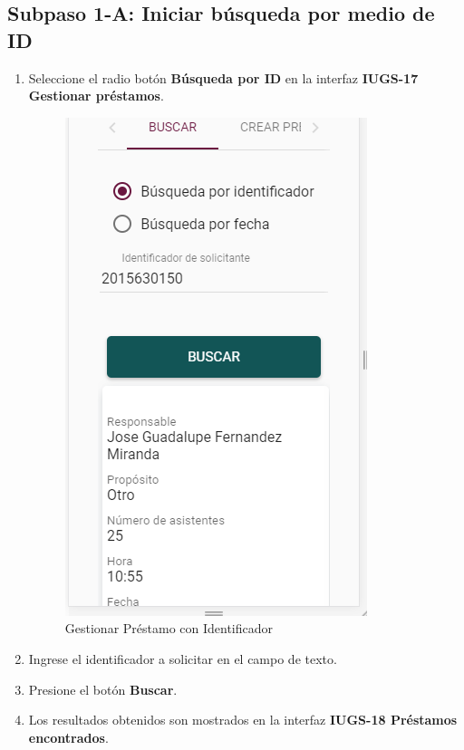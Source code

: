\subsection{Subpaso 1-A: Iniciar búsqueda por medio de ID}
\begin{enumerate}
	\item Seleccione el radio botón \textbf{Búsqueda por ID} en la interfaz
		\textbf{IUGS-17 Gestionar préstamos}.
		\begin{figure}[hbtp]
	\includegraphics[scale=0.3]{images/InterfazMovil/IUGS07_gestionarPrestamoID.PNG}
	\caption{Gestionar Préstamo con Identificador}
	\end{figure}
	\item Ingrese el identificador a solicitar en el campo de texto.
	\item Presione el botón \textbf{Buscar}.
	
	
	\item Los resultados obtenidos son mostrados en la interfaz \textbf{IUGS-18 Préstamos encontrados}.
\end{enumerate}

